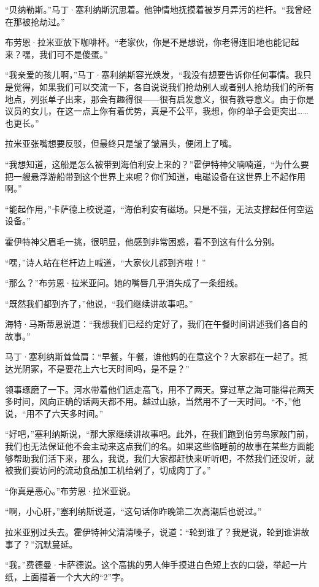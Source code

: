 \documentclass[AutoFakeBold=true]{book}
\begin{document}
``贝纳勒斯。''马丁·塞利纳斯沉思着。他钟情地抚摸着被岁月弄污的栏杆。``我曾经在那被抢劫过。''

布劳恩·拉米亚放下咖啡杯。``老家伙，你是不是想说，你老得连旧地也能记起来？嘿，我们可不是傻蛋。''

``我亲爱的孩儿啊，''马丁·塞利纳斯容光焕发，``我没有想要告诉你任何事情。我只是觉得，如果我们可以交流一下，各自说说我们抢劫别人或者别人抢劫我们的所有地点，列张单子出来，那会有趣得很——很有启发意义，很有教导意义。由于你是议员的女儿，在这一点上你有着优势，真是不公平，我想，你的单子会更突出……也更长。''

拉米亚张嘴想要反驳，但最终只是皱了皱眉头，便闭上了嘴。

``我想知道，这船是怎么被带到海伯利安上来的？''霍伊特神父喃喃道，``为什么要把一艘悬浮游船带到这个世界上来呢？你们知道，电磁设备在这世界上不起作用啊。''

``能起作用，''卡萨德上校说道，``海伯利安有磁场。只是不强，无法支撑起任何空运设备。''

霍伊特神父眉毛一挑，很明显，他感到非常困惑，看不到这有什么分别。

``嘿，''诗人站在栏杆边上喊道，``大家伙儿都到齐啦！''

``那么？''布劳恩·拉米亚问。她的嘴唇几乎消失成了一条细线。

``既然我们都到齐了，''他说，``我们继续讲故事吧。''

海特·马斯蒂恩说道：``我想我们已经约定好了，我们在午餐时间讲述我们各自的故事。''

马丁·塞利纳斯耸耸肩：``早餐，午餐，谁他妈的在意这个？大家都在一起了。抵达光阴冢，不是要花上六七天时间吗，是不是？''

领事琢磨了一下。河水带着他们远走高飞，用不了两天。穿过草之海可能得花两天多时间，风向正确的话两天都不用。越过山脉，当然用不了一天时间。``不，''他说，``用不了六天多时间。''

``好吧，''塞利纳斯说，``那大家继续讲故事吧。此外，在我们跑到伯劳鸟家敲门前，我们也无法保证他不会主动来这点我们的名。如果这些临睡前的故事在某些方面能够帮助我们活下来，那么，我说，我们大家都赶快来听听吧，不然我们还没听，就被我们要访问的流动食品加工机给剁了，切成肉丁了。''

``你真是恶心。''布劳恩·拉米亚说。

``啊，小心肝，''塞利纳斯说道，``这句话你昨晚第二次高潮后也说过。''

拉米亚别过头去。霍伊特神父清清嗓子，说道：``轮到谁了？我是说，轮到谁讲故事了？''沉默蔓延。

``我。''费德曼·卡萨德说。这个高挑的男人伸手摸进白色短上衣的口袋，举起一片纸，上面描着一个大大的``2''字。
\end{document}
